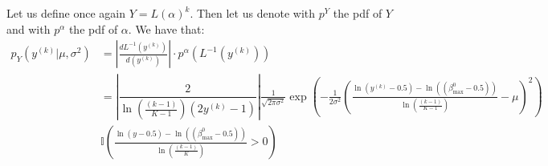 \documentclass[11pt]{amsart}
\begin{document}
Let us define once again $Y = L(\alpha)^k$. Then let us denote with $p^Y$ the pdf of $Y$ and with $p^\alpha$ the pdf of $\alpha$. We have that:
\begin{align}
\label{eq:pdfy}
p_Y(y^{(k)}|\mu, \sigma^2) &= \left| \frac{d L^{-1}(y^{(k)})}{d(y^{(k)})} \right| \cdot p^\alpha \left( L^{-1}(y^{(k)}) \right) \\
&= \left| \dfrac{2}{\ln\left(\frac{(k-1)}{K-1}\right)\left(2y^{(k)}-1\right)} \right| 
 \frac{1}{\sqrt{2\pi\sigma^2}} \exp{\left( -\frac{1}{2\sigma^2}  \left( \frac{\ln \left( y^{(k)} - 0.5 \right) -  \ln \left(  (\beta^0_{\max} - 0.5) \right)}{ \ln \left( \frac{(k-1)}{K-1} \right) }- \mu \right)^2 \right) } \nonumber \\
 & \mathbb{I}\left(\frac{\ln \left( y - 0.5 \right) -  \ln \left(  (\beta^0_{\max} - 0.5) \right)}{\ln \left( \frac{(k-1)}{K} \right) } > 0 \right) \nonumber
\end{align} 
\end{document}
